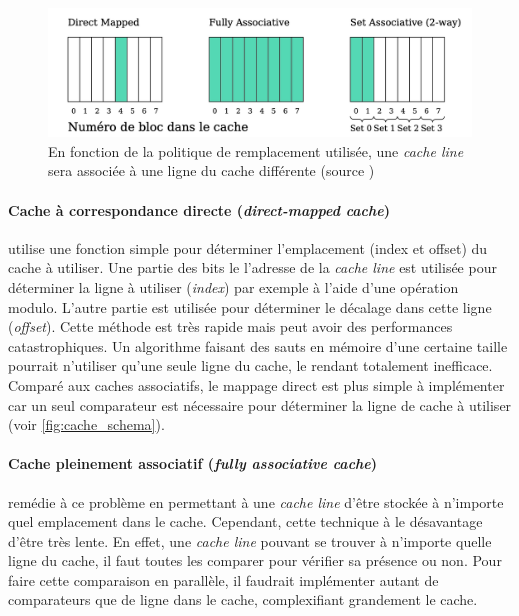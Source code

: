 \begin{figure}
    \center
    \includegraphics[width=12cm]{images/cache_associativite.png}
    \caption{\label{pic:cache_associativite} En fonction de la politique de remplacement utilisée, une \textit{cache line} sera associée à une ligne du cache différente (source \cite{Meunier2017})}
\end{figure}

\paragraph{Cache à correspondance directe (\textit{direct-mapped cache})} utilise une fonction simple pour déterminer l'emplacement (index et offset) du cache à utiliser. Une partie des bits le l'adresse de la \textit{cache line} est utilisée pour déterminer la ligne à utiliser (\textit{index}) par exemple à l'aide d'une opération modulo. L'autre partie est utilisée pour déterminer le décalage dans cette ligne (\textit{offset}). Cette méthode est très rapide mais peut avoir des performances catastrophiques. Un algorithme faisant des sauts en mémoire d'une certaine taille pourrait n'utiliser qu'une seule ligne du cache, le rendant totalement inefficace. Comparé aux caches associatifs, le mappage direct est plus simple à implémenter car un seul comparateur est nécessaire pour déterminer la ligne de cache à utiliser (voir \autoref{fig:cache_schema}).

\paragraph{Cache pleinement associatif (\textit{fully associative cache})} remédie à ce problème en permettant à une \textit{cache line} d'être stockée à n'importe quel emplacement dans le cache. Cependant, cette technique à le désavantage d'être très lente. En effet, une \textit{cache line} pouvant se trouver à n'importe quelle ligne du cache, il faut toutes les comparer pour vérifier sa présence ou non. Pour faire cette comparaison en parallèle, il faudrait implémenter autant de comparateurs que de ligne dans le cache, complexifiant grandement le cache.


